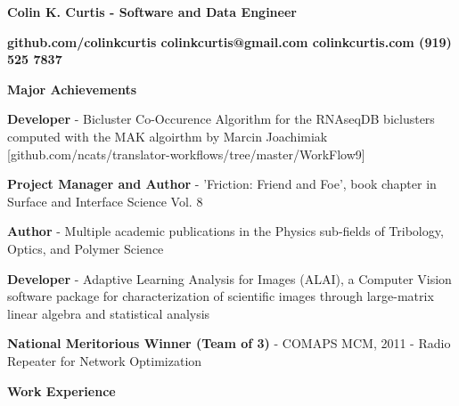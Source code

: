 \documentclass[letterpaper,final]{memoir}
\newcommand{\LargeSep}{\vspace{1.3em}}
\newcommand{\Sep}{\vspace{1.0em}}
\newcommand{\SmallSep}{\vspace{0.4em}}
\newcommand{\CVSection}[1]
	{\LARGE\textbf{#1}\par
	\SmallSep\normalsize}
\newcommand{\CVItem}[1]
	{\textbf{\color{Blue} #1}}
\newcommand\tab[1][1cm]{\hspace*{#1}}
\begin{document}
\Huge \bfseries {\color{Blue} Colin K. Curtis - Software and Data Engineer}

\Sep
\normalsize\normalfont

\CVItem  \tab \bfseries {github.com/colinkcurtis \tab colinkcurtis@gmail.com  \tab colinkcurtis.com \tab  (919) 525 7837} 

\LargeSep





\notoserif \CVSection{Major Achievements}
\normalfont

\Sep

\begin{compactitem}

    \item \textbf{Developer} - Bicluster Co-Occurence Algorithm for the RNAseqDB biclusters computed with the MAK algoirthm by Marcin Joachimiak [github.com/ncats/translator-workflows/tree/master/WorkFlow9]
    \SmallSep

    \item \textbf{Project Manager and Author} - 'Friction: Friend and Foe', book chapter in Surface and Interface Science Vol. 8
    \SmallSep

    \item \textbf{Author} - Multiple academic publications in the Physics sub-fields of Tribology, Optics, and Polymer Science
    \SmallSep

    \item \textbf{Developer} - Adaptive Learning Analysis for Images (ALAI), a Computer Vision software package for characterization of scientific images through large-matrix linear algebra and statistical analysis
    \SmallSep
    
    \item \textbf{National Meritorious Winner (Team of 3)} - COMAPS MCM, 2011 - Radio Repeater for Network Optimization
	
\end{compactitem}

\LargeSep


\notoserif \CVSection{Work Experience}
\normalfont

\Sep
\end{document}

